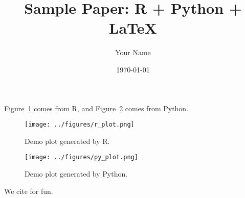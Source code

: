 \documentclass[11pt,a4paper]{article}
\title{Sample Paper: R + Python + \LaTeX{}}
\author{Your Name}
\date{\today}
\begin{document}
\maketitle

Figure~\ref{fig:rplot} comes from R, and Figure~\ref{fig:pyplot} comes from Python.

\begin{figure}[h!]
  \centering
  \texttt{[image: ../figures/r\_plot.png]}
  \caption{Demo plot generated by R.}
  \label{fig:rplot}
\end{figure}

\begin{figure}[h!]
  \centering
  \texttt{[image: ../figures/py\_plot.png]}
  \caption{Demo plot generated by Python.}
  \label{fig:pyplot}
\end{figure}

We cite \textcite{varian2014intermediate} for fun.

\printbibliography
\end{document}
